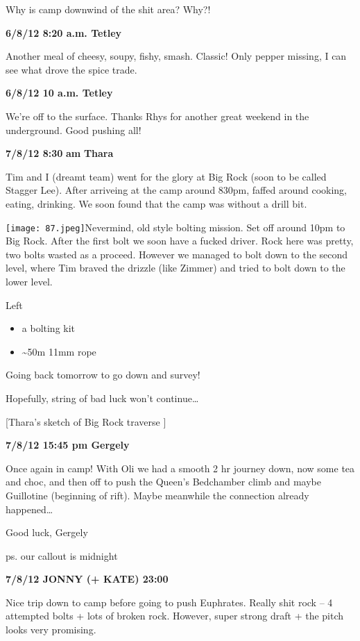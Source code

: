 Why is camp downwind of the shit area? Why?!

\textbf{6/8/12 8:20 a.m. Tetley}

Another meal of cheesy, soupy, fishy, smash. Classic! Only pepper
missing, I can see what drove the spice trade.

\textbf{6/8/12 10 a.m. Tetley}

We're off to the surface. Thanks Rhys for another great weekend in the
underground. Good pushing all!

\textbf{7/8/12 8:30} \textbf{am} \textbf{Thara}

Tim and I (dreamt team) went for the glory at Big Rock (soon to be
called Stagger Lee). After arriveing at the camp around 830pm, faffed
around cooking, eating, drinking. We soon found that the camp was
without a drill bit.

\texttt{[image: 87.jpeg]}Nevermind, old style bolting mission. Set off
around 10pm to Big Rock. After the first bolt we soon have a fucked
driver. Rock here was pretty, two bolts wasted as a proceed. However we
managed to bolt down to the second level, where Tim braved the drizzle
(like Zimmer) and tried to bolt down to the lower level.

Left

\begin{itemize}
\tightlist
\item
  a bolting kit
\item
  \textasciitilde{}50m 11mm rope
\end{itemize}

Going back tomorrow to go down and survey!

Hopefully, string of bad luck won't continue\ldots{}

{[}Thara's sketch of Big Rock traverse {]}

\textbf{7/8/12 15:45 pm Gergely}

Once again in camp! With Oli we had a smooth 2 hr journey down, now some
tea and choc, and then off to push the Queen's Bedchamber climb and
maybe Guillotine (beginning of rift). Maybe meanwhile the connection
already happened\ldots{}

Good luck, Gergely

ps. our callout is midnight

\textbf{7/8/12 JONNY (+ KATE) 23:00}

Nice trip down to camp before going to push Euphrates. Really shit rock
-- 4 attempted bolts + lots of broken rock. However, super strong draft
+ the pitch looks very promising.

